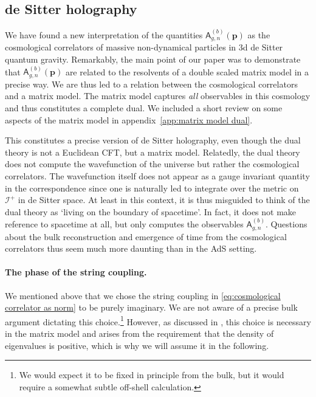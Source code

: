 \documentclass[12pt,a4paper]{article}
\begin{document}
\subsection{de Sitter holography}
We have found a new interpretation of the quantities $\mathsf{A}_{g,n}^{(b)}(\boldsymbol{p})$ as the cosmological correlators of massive non-dynamical particles in 3d de Sitter quantum gravity. Remarkably, the main point of our paper \cite{paper2} was to demonstrate that $\mathsf{A}_{g,n}^{(b)}(\boldsymbol{p})$ are related to the resolvents of a double scaled matrix model in a precise way. We are thus led to a relation between the cosmological correlators and a matrix model. 
The matrix model captures \emph{all} observables in this cosmology and thus constitutes a complete dual. We included a short review on some aspects of the matrix model in appendix~\ref{app:matrix model dual}.

This constitutes a precise version of de Sitter holography, even though the dual theory is not a Euclidean CFT, but a matrix model. Relatedly, the dual theory does not compute the wavefunction of the universe but rather the cosmological correlators.  The wavefunction itself does not appear as a gauge invariant quantity in the correspondence since one is naturally led to integrate over the metric on $\mathcal{I}^+$ in de Sitter space. At least in this context, it is thus misguided to think of the dual theory as `living on the boundary of spacetime'. In fact, it does not make reference to spacetime at all, but only computes the observables $\mathsf{A}_{g,n}^{(b)}$. Questions about the bulk reconstruction and emergence of time from the cosmological correlators thus seem much more daunting than in the AdS setting.

\paragraph{The phase of the string coupling.} We mentioned above that we chose the string coupling in \eqref{eq:cosmological correlator as norm} to be purely imaginary. We are not aware of a precise bulk argument dictating this choice.\footnote{We would expect it to be fixed in principle from the bulk, but it would require a somewhat subtle off-shell calculation.} However, as discussed in \cite{paper2}, this choice is necessary in the matrix model and arises from the requirement that the density of eigenvalues is positive, which is why we will assume it in the following.
\end{document}
